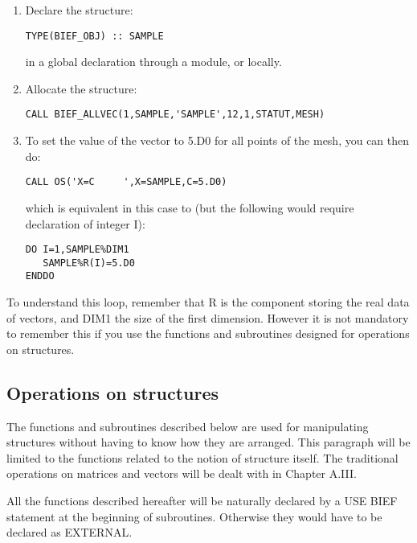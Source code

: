 \begin{enumerate}
  \item Declare the structure:

\begin{lstlisting}[language=TelFortran]
TYPE(BIEF_OBJ) :: SAMPLE
\end{lstlisting}
in a global declaration through a module, or locally.

  \item Allocate the structure:

\begin{lstlisting}[language=TelFortran]
CALL BIEF_ALLVEC(1,SAMPLE,'SAMPLE',12,1,STATUT,MESH)
\end{lstlisting}

  \item To set the value of the vector to 5.D0 for all points of the mesh, you
    can then do:

\begin{lstlisting}[language=TelFortran]
CALL OS('X=C     ',X=SAMPLE,C=5.D0)
\end{lstlisting}
which is equivalent in this case to (but the following would require
declaration of integer I):

\begin{lstlisting}[language=TelFortran]
DO I=1,SAMPLE%DIM1
   SAMPLE%R(I)=5.D0
ENDDO
\end{lstlisting}
\end{enumerate}
To understand this loop, remember that R is the component storing the real data
of vectors, and DIM1 the size of the first dimension. However it is not
mandatory to remember this if you use the functions and subroutines designed
for operations on structures.

\subsection{Operations on structures}

The functions and subroutines described below are used for manipulating
structures without having to know how they are arranged. This paragraph will be
limited to the functions related to the notion of structure itself. The
traditional operations on matrices and vectors will be dealt with in Chapter
A.III.

All the functions described hereafter will be naturally declared by a USE BIEF
statement at the beginning of subroutines. Otherwise they would have to be
declared as EXTERNAL.

